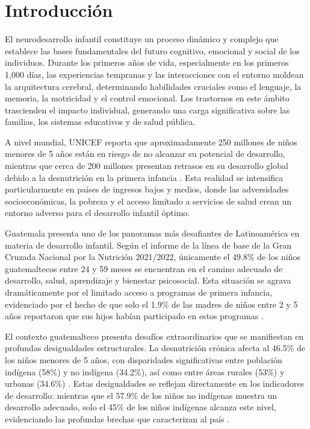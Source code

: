 \documentclass[11pt,letterpaper]{report}
\begin{document}
\chapter{Introducción}
El neurodesarrollo infantil constituye un proceso dinámico y complejo que 
establece las bases fundamentales del futuro cognitivo, emocional y social de 
los individuos. Durante los primeros años de vida, especialmente en los primeros
1,000 días, las experiencias tempranas y las interacciones con el entorno
moldean la arquitectura cerebral, determinando habilidades cruciales como el
lenguaje, la memoria, la motricidad y el control emocional. Los trastornos en
este ámbito trascienden el impacto individual, generando una carga significativa
sobre las familias, los sistemas educativos y de salud pública.

A nivel mundial, UNICEF reporta que aproximadamente 250 millones de niños
menores de 5 años están en riesgo de no alcanzar su potencial de desarrollo,
mientras  que cerca de 200 millones presentan retrasos en su desarrollo global
debido a  la desnutrición en la primera infancia \cite{UNICEF2023}. Esta
realidad se  intensifica particularmente en países de ingresos bajos y medios,
donde las  adversidades socioeconómicas, la pobreza y el acceso limitado a
servicios de  salud crean un entorno adverso para el desarrollo infantil óptimo.

Guatemala presenta uno de los panoramas más desafiantes de Latinoamérica en
materia de desarrollo infantil. Según el informe de la línea de base de la Gran
Cruzada Nacional por la Nutrición 2021/2022, únicamente el 49.8\% de los niños
guatemaltecos entre 24 y 59 meses se encuentran en el camino adecuado de
desarrollo, salud, aprendizaje y bienestar psicosocial. Esta situación se agrava
dramáticamente por el limitado acceso a programas de primera infancia,
evidenciado por el hecho de que solo el 1.9\% de las madres de niños entre 2 y 5
años reportaron que sus hijos habían participado en estos programas
\cite{SESAN2022}.

El contexto guatemalteco presenta desafíos extraordinarios que se manifiestan en
profundas desigualdades estructurales. La desnutrición crónica afecta al 46.5\%
de los niños menores de 5 años, con disparidades significativas entre población
indígena (58\%) y no indígena (34.2\%), así como entre áreas rurales (53\%) y
urbanas (34.6\%) \cite{EnMaternoInfantil}. Estas desigualdades se reflejan
directamente en los indicadores de desarrollo: mientras que el 57.9\% de los
niños no indígenas muestra un desarrollo adecuado, solo el 45\% de los niños
indígenas alcanza este nivel, evidenciando las profundas brechas que
caracterizan al país \cite{SESAN2022}.
\end{document}
